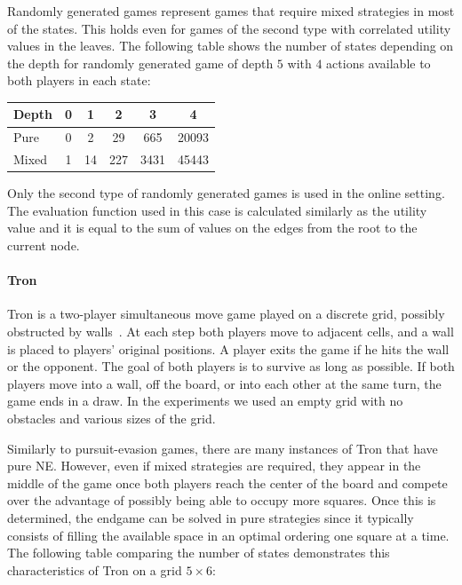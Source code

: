 Randomly generated games represent games that require mixed strategies in most of the states. 
This holds even for games of the second type with correlated utility values in the leaves.
The following table shows the number of states depending on the depth for randomly generated game of depth $5$ with $4$ actions available to both players in each state:

\vspace{0.1cm}

\begin{center}
\small
\begin{tabular}{|l|c|c|c|c|c|}
\hline Depth & 0 & 1 & 2 & 3 & 4 \\
\hline Pure  & 0 & 2 & 29 & 665 & 20093 \\
\hline Mixed & 1 & 14 & 227 & 3431 & 45443 \\
\hline
\end{tabular}
\end{center}

\vspace{0.1cm}

Only the second type of randomly generated games is used in the online setting. 
The evaluation function used in this case is calculated similarly as the utility value and it is equal to the sum of values on the edges from the root to the current node.

\paragraph{\textbf{Tron}} 
Tron is a two-player simultaneous move game played on a discrete grid, possibly obstructed by 
walls~\cite{Samothrakis10Tron,Perick12Comparison,Lanctot13Tron}.
At each step both players move to adjacent cells, and a wall is placed to players' original positions.
A player exits the game if he hits the wall or the opponent.
The goal of both players is to survive as long as possible. 
If both players move into a wall, off the board, or into each other at the same turn, the game ends in a draw.
In the experiments we used an empty grid with no obstacles and various sizes of the grid.

Similarly to pursuit-evasion games, there are many instances of Tron that have pure NE.
However, even if mixed strategies are required, they appear in the middle of the game once both players reach the center of the board and compete over the advantage of possibly being able to occupy more squares.
Once this is determined, the endgame can be solved in pure strategies since it typically consists of filling the available space in an optimal ordering one square at a time.
The following table comparing the number of states demonstrates this characteristics of Tron on a grid $5\times6$:

